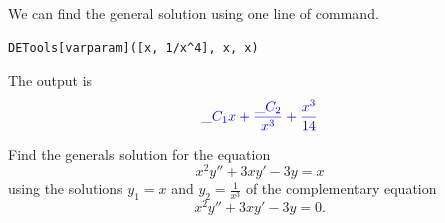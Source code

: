 \documentclass[
  12pt]{elegantbook}
\begin{document}
\begin{solution}
We can find the general solution using one line of command.

\begin{verbatim}
DETools[varparam]([x, 1/x^4], x, x)
\end{verbatim}

The output is
\[
\color{blue}{
  \_C_{1} x +\frac{\_C_{2}}{x^{3}}+\frac{x^{3}}{14}
}
\]
\end{solution}

\begin{exercise}
Find the generals solution for the equation
\[x^2y'' + 3xy' - 3y=x\]
using the solutions \(y_1=x\) and \(y_2=\frac{1}{x^3}\) of the complementary equation
\[x^2y'' + 3xy' - 3y=0.\]
\end{exercise}
\end{document}
